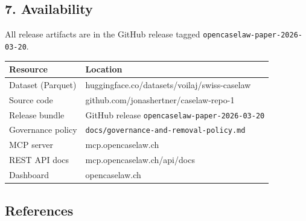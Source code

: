 \documentclass[
  11pt,
]{article}
\newcounter{none} %
\begin{document}
\subsection{7. Availability}\label{availability}

All release artifacts are in the GitHub release tagged
\texttt{opencaselaw-paper-2026-03-20}.

{\def\LTcaptype{none} %
\begin{longtable}[]{@{}ll@{}}
\toprule\noalign{}
Resource & Location \\
\midrule\noalign{}
\endhead
\bottomrule\noalign{}
\endlastfoot
Dataset (Parquet) & huggingface.co/datasets/voilaj/swiss-caselaw \\
Source code & github.com/jonashertner/caselaw-repo-1 \\
Release bundle & GitHub release \texttt{opencaselaw-paper-2026-03-20} \\
Governance policy & \texttt{docs/governance-and-removal-policy.md} \\
MCP server & mcp.opencaselaw.ch \\
REST API docs & mcp.opencaselaw.ch/api/docs \\
Dashboard & opencaselaw.ch \\
\end{longtable}
}

\subsection{References}\label{references}
\end{document}
